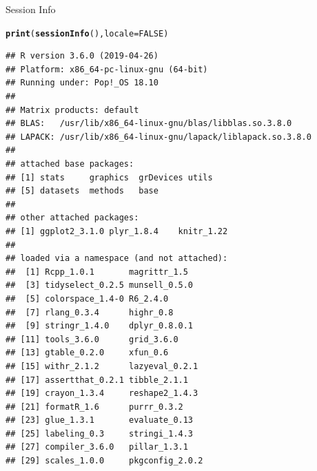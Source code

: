\documentclass[10pt]{beamer}\usepackage[]{graphicx}\usepackage[]{color}
\makeatletter
\newcommand{\hlnum}[1]{\textcolor[rgb]{0.686,0.059,0.569}{#1}}%
\newcommand{\hlstd}[1]{\textcolor[rgb]{0.345,0.345,0.345}{#1}}%
\newcommand{\hlkwc}[1]{\textcolor[rgb]{0.333,0.667,0.333}{#1}}%
\newcommand{\hlkwd}[1]{\textcolor[rgb]{0.737,0.353,0.396}{\textbf{#1}}}%
\newenvironment{kframe}{%
 \def\at@end@of@kframe{}%
 \ifinner\ifhmode%
  \def\at@end@of@kframe{\end{minipage}}%
  \begin{minipage}{\columnwidth}%
 \fi\fi%
 \def\FrameCommand##1{\hskip\@totalleftmargin \hskip-\fboxsep
 \colorbox{shadecolor}{##1}\hskip-\fboxsep
     \hskip-\linewidth \hskip-\@totalleftmargin \hskip\columnwidth}%
 \MakeFramed {\advance\hsize-\width
   \@totalleftmargin\z@ \linewidth\hsize
   \@setminipage}}%
 {\par\unskip\endMakeFramed%
 \at@end@of@kframe}
\newenvironment{knitrout}{}{} %
\makeatother
\begin{document}
\begin{frame}[fragile]{Session Info}
\begin{knitrout}\footnotesize
{}\color{fgcolor}\begin{kframe}
\begin{alltt}
\hlkwd{print}\hlstd{(}\hlkwd{sessionInfo}\hlstd{(),} \hlkwc{locale} \hlstd{=} \hlnum{FALSE}\hlstd{)}
\end{alltt}
\begin{verbatim}
## R version 3.6.0 (2019-04-26)
## Platform: x86_64-pc-linux-gnu (64-bit)
## Running under: Pop!_OS 18.10
## 
## Matrix products: default
## BLAS:   /usr/lib/x86_64-linux-gnu/blas/libblas.so.3.8.0
## LAPACK: /usr/lib/x86_64-linux-gnu/lapack/liblapack.so.3.8.0
## 
## attached base packages:
## [1] stats     graphics  grDevices utils    
## [5] datasets  methods   base     
## 
## other attached packages:
## [1] ggplot2_3.1.0 plyr_1.8.4    knitr_1.22   
## 
## loaded via a namespace (and not attached):
##  [1] Rcpp_1.0.1       magrittr_1.5    
##  [3] tidyselect_0.2.5 munsell_0.5.0   
##  [5] colorspace_1.4-0 R6_2.4.0        
##  [7] rlang_0.3.4      highr_0.8       
##  [9] stringr_1.4.0    dplyr_0.8.0.1   
## [11] tools_3.6.0      grid_3.6.0      
## [13] gtable_0.2.0     xfun_0.6        
## [15] withr_2.1.2      lazyeval_0.2.1  
## [17] assertthat_0.2.1 tibble_2.1.1    
## [19] crayon_1.3.4     reshape2_1.4.3  
## [21] formatR_1.6      purrr_0.3.2     
## [23] glue_1.3.1       evaluate_0.13   
## [25] labeling_0.3     stringi_1.4.3   
## [27] compiler_3.6.0   pillar_1.3.1    
## [29] scales_1.0.0     pkgconfig_2.0.2
\end{verbatim}
\end{kframe}
\end{knitrout}
\end{frame}
\end{document}

